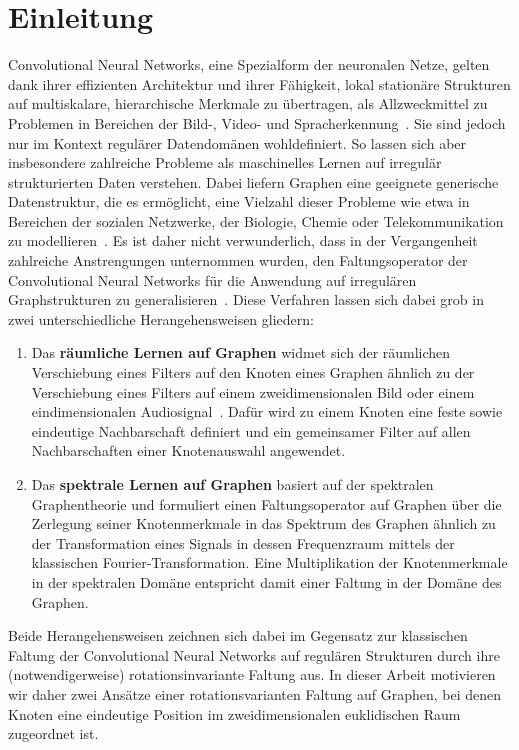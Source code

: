 \chapter{Einleitung}
\label{einleitung}

Convolutional Neural Networks, eine Spezialform der neuronalen Netze, gelten dank ihrer effizienten Architektur und ihrer Fähigkeit, lokal stationäre Strukturen auf multiskalare, hierarchische Merkmale zu übertragen, als Allzweckmittel zu Problemen in Bereichen der Bild-, Video- und Spracherkennung~\cite{Defferrard}.
Sie sind jedoch nur im Kontext regulärer Datendomänen wohldefiniert.
So lassen sich aber insbesondere zahlreiche Probleme als maschinelles Lernen auf irregulär strukturierten Daten verstehen.
Dabei liefern Graphen eine geeignete generische Datenstruktur, die es ermöglicht, eine Vielzahl dieser Probleme wie etwa in Bereichen der sozialen Netzwerke, der Biologie, Chemie oder Telekommunikation zu modellieren~\cite{Shuman}.
Es ist daher nicht verwunderlich, dass in der Vergangenheit zahlreiche Anstrengungen unternommen wurden, den Faltungsoperator der Convolutional Neural Networks für die Anwendung auf irregulären Graphstrukturen zu generalisieren~\cite{patchy, Defferrard, gcn}.
Diese Verfahren lassen sich dabei grob in zwei unterschiedliche Herangehensweisen gliedern:
\begin{enumerate}
  \item Das \textbf{räumliche Lernen auf Graphen} widmet sich der räumlichen Verschiebung eines Filters auf den Knoten eines Graphen ähnlich zu der Verschiebung eines Filters auf einem zweidimensionalen Bild oder einem eindimensionalen Audiosignal~\cite{patchy}.
  Dafür wird zu einem Knoten eine feste sowie eindeutige Nachbarschaft definiert und ein gemeinsamer Filter auf allen Nachbarschaften einer Knotenauswahl angewendet.
  \item Das \textbf{spektrale Lernen auf Graphen} basiert auf der spektralen Graphentheorie und formuliert einen Faltungsoperator auf Graphen über die Zerlegung seiner Knotenmerkmale in das Spektrum des Graphen ähnlich zu der Transformation eines Signals in dessen Frequenzraum mittels der klassischen Fourier-Transformation.
  Eine Multiplikation der Knotenmerkmale in der spektralen Domäne entspricht damit einer Faltung in der Domäne des Graphen.
\end{enumerate}
Beide Herangehensweisen zeichnen sich dabei im Gegensatz zur klassischen Faltung der Convolutional Neural Networks auf regulären Strukturen durch ihre (notwendigerweise) rotationsinvariante Faltung aus.
In dieser Arbeit motivieren wir daher zwei Ansätze \bzgl{} einer rotationsvarianten Faltung auf Graphen, bei denen Knoten eine eindeutige Position im zweidimensionalen euklidischen Raum zugeordnet ist.



